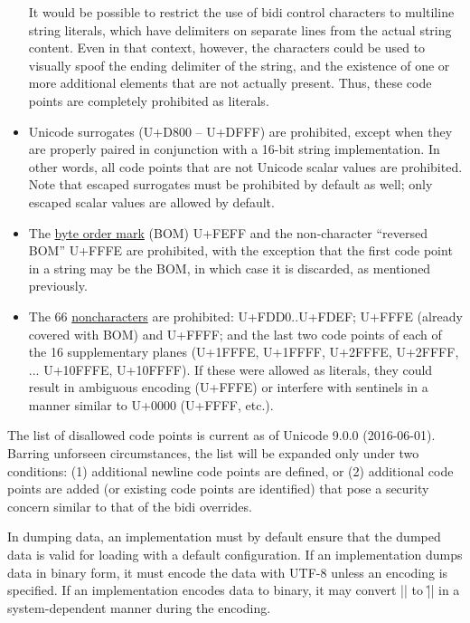 \documentclass[11pt]{article}
\begin{document}
\begin{itemize}
It would be possible to restrict the use of bidi control characters to multiline string literals, which have delimiters on separate lines from the actual string content.  Even in that context, however, the characters could be used to visually spoof the ending delimiter of the string, and the existence of one or more additional elements that are not actually present.  Thus, these code points are completely prohibited as literals.

\item Unicode surrogates (U+D800 -- U+DFFF) are prohibited, except when they are properly paired in conjunction with a 16-bit string implementation.  In other words, all code points that are not Unicode scalar values are prohibited.  Note that escaped surrogates must be prohibited by default as well; only escaped scalar values are allowed by default.

\item The \href{http://www.unicode.org/faq/utf_bom.html#bom1}{byte order mark} (BOM) U+FEFF and the non-character ``reversed BOM'' U+FFFE are prohibited, with the exception that the first code point in a string may be the BOM, in which case it is discarded, as mentioned previously.

\item The 66 \href{http://www.unicode.org/faq/private_use.html#noncharacters}{noncharacters} are prohibited:  U+FDD0..U+FDEF; U+FFFE (already covered with BOM) and U+FFFF; and the last two code points of each of the 16 supplementary planes (U+1FFFE, U+1FFFF, U+2FFFE, U+2FFFF, ... U+10FFFE, U+10FFFF).  If these were allowed as literals, they could result in ambiguous encoding (U+FFFE) or interfere with sentinels in a manner similar to U+0000 (U+FFFF, etc.).
\end{itemize}
The list of disallowed code points is current as of Unicode 9.0.0 (2016-06-01).  Barring unforseen circumstances, the list will be expanded only under two conditions:  (1) additional newline code points are defined, or (2) additional code points are added (or existing code points are identified) that pose a security concern similar to that of the bidi overrides.

In dumping data, an implementation must by default ensure that the dumped data is valid for loading with a default configuration.  If an implementation dumps data in binary form, it must encode the data with UTF-8 unless an encoding is specified.  If an implementation encodes data to binary, it may convert |\n| to |\r\n| in a system-dependent manner during the encoding.
\end{document}
